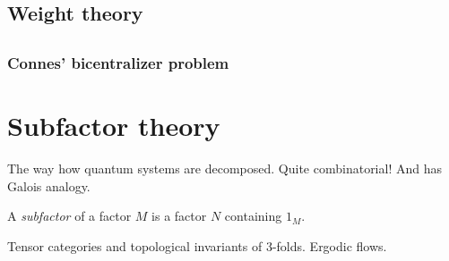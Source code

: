 \documentclass{../../large}
\begin{document}
\begin{prb}

\end{prb}




\chapter{Weight theory}





\chapter{}
\section{Connes' bicentralizer problem}



















\part{Subfactor theory}






The way how quantum systems are decomposed.
Quite combinatorial!
And has Galois analogy.

\begin{prb}
A \emph{subfactor} of a factor $M$ is a factor $N$ containing $1_M$.
\end{prb}

Tensor categories and topological invariants of 3-folds.
Ergodic flows.
\end{document}
